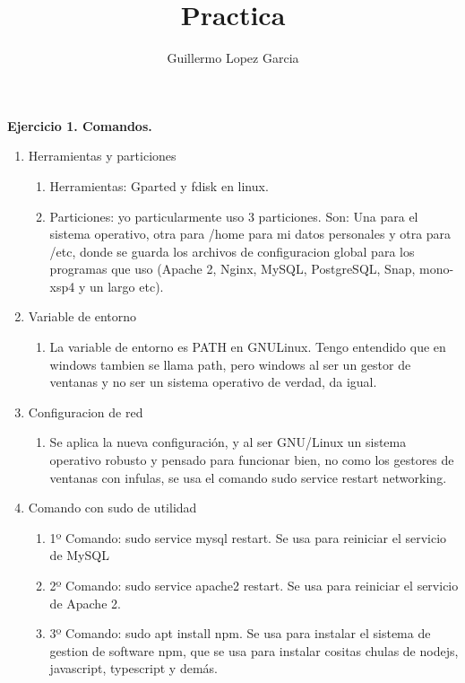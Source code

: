 \documentclass{article}
\title{Practica }
\author{Guillermo Lopez Garcia}
\begin{document}
\textbf{Ejercicio 1. Comandos.}
\begin{enumerate}
    \item Herramientas y particiones
        \begin{enumerate}
            \item Herramientas: Gparted y fdisk en linux.
            \item Particiones: yo particularmente uso 3 particiones. Son: Una para el sistema operativo, otra
                  para /home para mi datos
                  personales y otra para /etc, donde se guarda los archivos de configuracion global
                  para los programas que uso (Apache 2,
                  Nginx, MySQL, PostgreSQL, Snap, mono-xsp4 y un largo etc).
        \end{enumerate}
    \item Variable de entorno
        \begin{enumerate}
            \item La variable de entorno es PATH en GNULinux. Tengo entendido que en windows
                  tambien se llama path, pero windows
                  al ser un gestor de ventanas y no ser un sistema operativo de verdad, da igual.
        \end{enumerate}
    \item Configuracion de red
        \begin{enumerate}
            \item Se aplica la nueva configuración, y al ser GNU/Linux un sistema operativo
                  robusto y pensado para funcionar bien,
                  no como los gestores de ventanas con infulas, se usa el comando sudo service restart networking.
        \end{enumerate}
    \item Comando con sudo de utilidad
        \begin{enumerate}
            \item 1º Comando: sudo service mysql restart. Se usa para reiniciar el servicio de MySQL
            \item 2º Comando: sudo service apache2 restart. Se usa para reiniciar el servicio de Apache 2.
            \item 3º Comando: sudo apt install npm. Se usa para instalar el sistema de gestion de software npm, que se usa
                  para instalar cositas chulas de nodejs, javascript, typescript y demás.
        \end{enumerate}
\end{enumerate}
\end{document}
